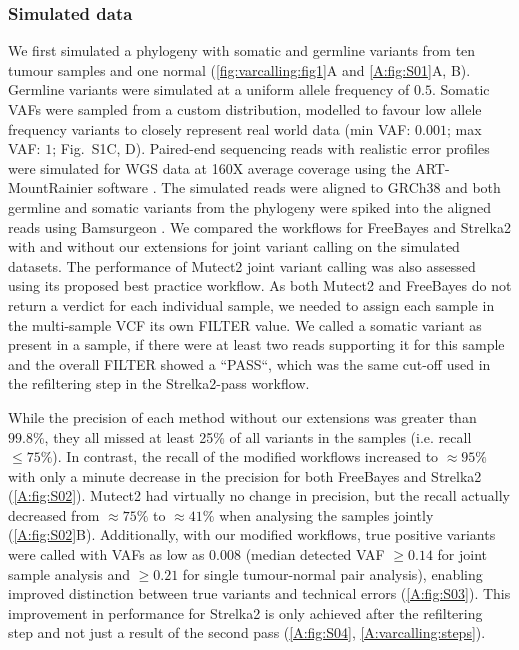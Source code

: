 \subsubsection{Simulated data}
\label{variantcalling-sec:simdata}
We first simulated a phylogeny with somatic and germline variants from ten tumour samples and one normal (\autoref{fig:varcalling:fig1}A and \autoref{A:fig:S01}A, B). Germline variants were simulated at a uniform allele frequency of $0.5$. Somatic VAFs were sampled from a custom distribution, modelled to favour low allele frequency variants to closely represent real world data (min VAF: $0.001$; max VAF: $1$; Fig.~S1C, D). Paired-end sequencing reads with realistic error profiles were simulated for WGS data at 160X average coverage using the ART-MountRainier software \parencite{Huang2011}. The simulated reads were aligned to GRCh38 and both germline and somatic variants from the phylogeny were spiked into the aligned reads using Bamsurgeon \parencite{Ewing2015}. We compared the workflows for FreeBayes and Strelka2 with and without our extensions for joint variant calling on the simulated datasets. The performance of Mutect2 joint variant calling was also assessed using its proposed best practice workflow. As both Mutect2 and FreeBayes do not return a verdict for each individual sample, we needed to assign each sample in the multi-sample VCF its own FILTER value. We called a somatic variant as present in a sample, if there were at least two reads supporting it for this sample and the overall FILTER showed a ``PASS``, which was the same cut-off used in the refiltering step in the Strelka2-pass workflow.

While the precision of each method without our extensions was greater than $99.8\%$, they all missed at least 25\% of all variants in the samples (i.e. recall $\leq 75\%$). In contrast, the recall of the modified workflows increased to $\approx 95\%$ with only a minute decrease in the precision for both FreeBayes and Strelka2 (\autoref{A:fig:S02}). Mutect2 had virtually no change in precision, but the recall actually decreased from $\approx 75\%$ to $\approx 41\%$ when analysing the samples jointly (\autoref{A:fig:S02}B). Additionally, with our modified workflows, true positive variants were called with VAFs as low as 0.008 (median detected VAF $\geq 0.14$ for joint sample analysis and $\geq 0.21$ for single tumour-normal pair analysis), enabling improved distinction between true variants and technical errors (\autoref{A:fig:S03}). This improvement in performance for Strelka2 is only achieved after the refiltering step and not just a result of the second pass (\autoref{A:fig:S04}, \autoref{A:varcalling:steps}).

